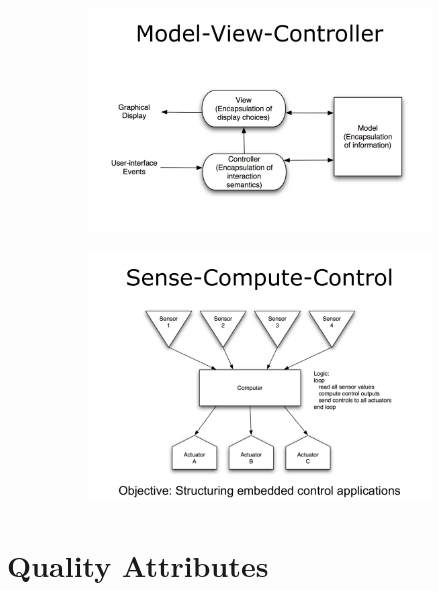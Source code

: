 \documentclass[a4paper]{article}
\begin{document}
\begin{figure}[H]
\hskip-2.5cm\begin{subfigure}{1.2\textwidth}
  \includegraphics[width=1.2\linewidth]
  {images/3-model-view-controller.png}
\end{subfigure}
\end{figure}


\begin{figure}[H]
\hskip-2.5cm\begin{subfigure}{1.2\textwidth}
  \includegraphics[width=1.2\linewidth]
  {images/3-sense-compute-control.png}
\end{subfigure}
\end{figure}
\newpage

\section{Quality Attributes}
\end{document}
